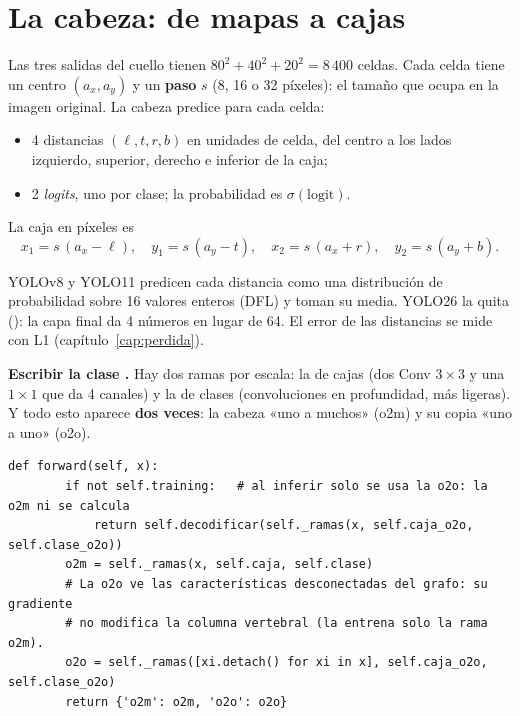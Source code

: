\section{La cabeza: de mapas a cajas}

Las tres salidas del cuello tienen $80^2 + 40^2 + 20^2 = 8\,400$ celdas. Cada
celda tiene un centro $(a_x, a_y)$ y un \textbf{paso} $s$ (8, 16 o 32 píxeles):
el tamaño que ocupa en la imagen original. La cabeza predice para cada celda:
\begin{itemize}
  \item 4 distancias $(\ell, t, r, b)$ en unidades de celda, del centro a los lados
        izquierdo, superior, derecho e inferior de la caja;
  \item 2 \emph{logits}, uno por clase; la probabilidad es $\sigma(\text{logit})$.
\end{itemize}
La caja en píxeles es
\begin{equation}
x_1 = s\,(a_x - \ell),\quad y_1 = s\,(a_y - t),\quad
x_2 = s\,(a_x + r),\quad y_2 = s\,(a_y + b).
\label{eq:caja}
\end{equation}

\begin{tecnico}
YOLOv8 y YOLO11 predicen cada distancia como una distribución de probabilidad
sobre 16 valores enteros (DFL) y toman su media. YOLO26 la quita
(): la capa final da 4 números en lugar de 64. El error de
las distancias se mide con L1 (capítulo~\ref{cap:perdida}).
\end{tecnico}

 \textbf{Escribir la clase .}
Hay dos ramas por escala: la de cajas (dos Conv $3\times3$ y una $1\times1$ que
da 4 canales) y la de clases (convoluciones en profundidad, más ligeras). Y todo
esto aparece \textbf{dos veces}: la cabeza «uno a muchos» (o2m) y su copia «uno
a uno» (o2o).

\begin{lstlisting}[style=py]
    def forward(self, x):
        if not self.training:   # al inferir solo se usa la o2o: la o2m ni se calcula
            return self.decodificar(self._ramas(x, self.caja_o2o, self.clase_o2o))
        o2m = self._ramas(x, self.caja, self.clase)
        # La o2o ve las características desconectadas del grafo: su gradiente
        # no modifica la columna vertebral (la entrena solo la rama o2m).
        o2o = self._ramas([xi.detach() for xi in x], self.caja_o2o, self.clase_o2o)
        return {'o2m': o2m, 'o2o': o2o}
\end{lstlisting}

